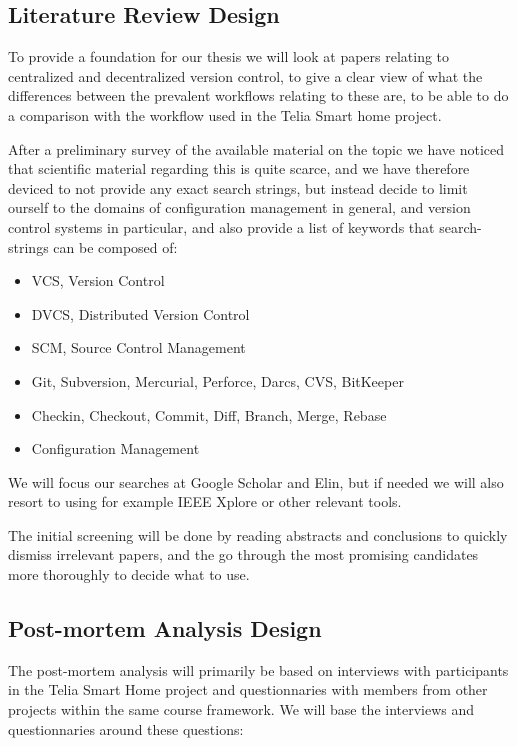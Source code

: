 \documentclass{llncs}
\begin{document}
\subsection{Literature Review Design}

To provide a foundation for our thesis we will look at papers relating
to centralized and decentralized version control, to give a clear view
of what the differences between the prevalent workflows relating to
these are, to be able to do a comparison with the workflow used in the
Telia Smart home project. %

After a preliminary survey of the available material on the topic we
have noticed that scientific material regarding this is quite scarce,
and we have therefore deviced to not provide any exact search strings,
but instead decide to limit ourself to the domains of configuration
management in general, and version control systems in particular, and
also provide a list of keywords that search-strings can be composed
of: %

\begin{itemize}
  \item VCS, Version Control
  \item DVCS, Distributed Version Control
  \item SCM, Source Control Management
  \item Git, Subversion, Mercurial, Perforce, Darcs, CVS, BitKeeper
  \item Checkin, Checkout, Commit, Diff, Branch, Merge, Rebase
  \item Configuration Management
\end{itemize}

We will focus our searches at Google Scholar and Elin, but if needed
we will also resort to using for example IEEE Xplore or other relevant
tools.

The initial screening will be done by reading abstracts and
conclusions to quickly dismiss irrelevant papers, and the go through
the most promising candidates more thoroughly to decide what to use.

\subsection{Post-mortem Analysis Design}

The post-mortem analysis will primarily be based on interviews with
participants in the Telia Smart Home project and questionnaries with
members from other projects within the same course framework. We will
base the interviews and questionnaries around these questions:
\end{document}
